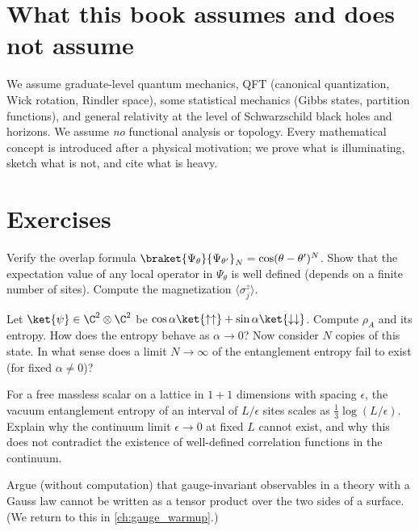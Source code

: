 \section{What this book assumes and does not assume}

We assume graduate-level quantum mechanics, QFT (canonical quantization, Wick rotation, Rindler space), some statistical mechanics (Gibbs states, partition functions), and general relativity at the level of Schwarzschild black holes and horizons. We assume \emph{no} functional analysis or topology. Every mathematical concept is introduced after a physical motivation; we prove what is illuminating, sketch what is not, and cite what is heavy.

\section*{Exercises}
\begin{exercise}
Verify the overlap formula $\braket{\Psi_\theta}{\Psi_{\theta'}}_N=\cos(\theta-\theta')^N$. Show that the expectation value of any local operator in $\Psi_\theta$ is well defined (depends on a finite number of sites). Compute the magnetization $\langle\sigma^z_j\rangle$.
\end{exercise}
\begin{exercise}
Let $\ket{\psi}\in\C^2\otimes\C^2$ be $\cos\alpha\ket{\uparrow\uparrow}+\sin\alpha\ket{\downarrow\downarrow}$. Compute $\rho_A$ and its entropy. How does the entropy behave as $\alpha\to0$? Now consider $N$ copies of this state. In what sense does a limit $N\to\infty$ of the entanglement entropy fail to exist (for fixed $\alpha\ne0$)?
\end{exercise}
\begin{exercise}
For a free massless scalar on a lattice in $1+1$ dimensions with spacing $\epsilon$, the vacuum entanglement entropy of an interval of $L/\epsilon$ sites scales as $\tfrac13\log(L/\epsilon)$. Explain why the continuum limit $\epsilon\to0$ at fixed $L$ cannot exist, and why this does not contradict the existence of well-defined correlation functions in the continuum.
\end{exercise}
\begin{exercise}
Argue (without computation) that gauge-invariant observables in a theory with a Gauss law cannot be written as a tensor product over the two sides of a surface. (We return to this in \cref{ch:gauge_warmup}.)
\end{exercise}
